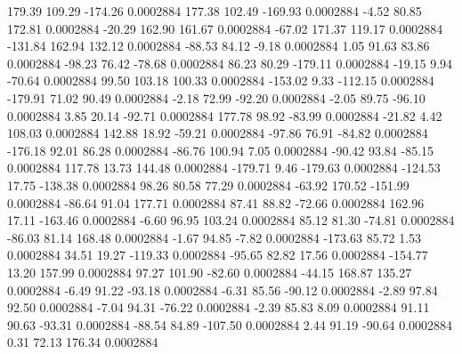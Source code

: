       179.39      109.29     -174.26     0.0002884
      177.38      102.49     -169.93     0.0002884
       -4.52       80.85      172.81     0.0002884
      -20.29      162.90      161.67     0.0002884
      -67.02      171.37      119.17     0.0002884
     -131.84      162.94      132.12     0.0002884
      -88.53       84.12       -9.18     0.0002884
        1.05       91.63       83.86     0.0002884
      -98.23       76.42      -78.68     0.0002884
       86.23       80.29     -179.11     0.0002884
      -19.15        9.94      -70.64     0.0002884
       99.50      103.18      100.33     0.0002884
     -153.02        9.33     -112.15     0.0002884
     -179.91       71.02       90.49     0.0002884
       -2.18       72.99      -92.20     0.0002884
       -2.05       89.75      -96.10     0.0002884
        3.85       20.14      -92.71     0.0002884
      177.78       98.92      -83.99     0.0002884
      -21.82        4.42      108.03     0.0002884
      142.88       18.92      -59.21     0.0002884
      -97.86       76.91      -84.82     0.0002884
     -176.18       92.01       86.28     0.0002884
      -86.76      100.94        7.05     0.0002884
      -90.42       93.84      -85.15     0.0002884
      117.78       13.73      144.48     0.0002884
     -179.71        9.46     -179.63     0.0002884
     -124.53       17.75     -138.38     0.0002884
       98.26       80.58       77.29     0.0002884
      -63.92      170.52     -151.99     0.0002884
      -86.64       91.04      177.71     0.0002884
       87.41       88.82      -72.66     0.0002884
      162.96       17.11     -163.46     0.0002884
       -6.60       96.95      103.24     0.0002884
       85.12       81.30      -74.81     0.0002884
      -86.03       81.14      168.48     0.0002884
       -1.67       94.85       -7.82     0.0002884
     -173.63       85.72        1.53     0.0002884
       34.51       19.27     -119.33     0.0002884
      -95.65       82.82       17.56     0.0002884
     -154.77       13.20      157.99     0.0002884
       97.27      101.90      -82.60     0.0002884
      -44.15      168.87      135.27     0.0002884
       -6.49       91.22      -93.18     0.0002884
       -6.31       85.56      -90.12     0.0002884
       -2.89       97.84       92.50     0.0002884
       -7.04       94.31      -76.22     0.0002884
       -2.39       85.83        8.09     0.0002884
       91.11       90.63      -93.31     0.0002884
      -88.54       84.89     -107.50     0.0002884
        2.44       91.19      -90.64     0.0002884
        0.31       72.13      176.34     0.0002884
